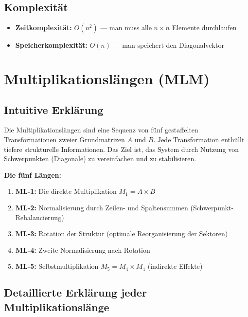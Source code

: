 \documentclass[a4paper,12pt]{article}
\begin{document}
\subsection{Komplexität}

\begin{itemize}
\item \textbf{Zeitkomplexität:} $O(n^2)$ — man muss alle $n \times n$ Elemente durchlaufen
\item \textbf{Speicherkomplexität:} $O(n)$ — man speichert den Diagonalvektor
\end{itemize}


\section{Multiplikationslängen (MLM)}

\subsection{Intuitive Erklärung}

Die Multiplikationslängen sind eine Sequenz von fünf gestaffelten Transformationen zweier Grundmatrizen $A$ und $B$. Jede Transformation enthüllt tiefere strukturelle Informationen. Das Ziel ist, das System durch Nutzung von Schwerpunkten (Diagonale) zu vereinfachen und zu stabilisieren.

\textbf{Die fünf Längen:}
\begin{enumerate}
\item \textbf{ML-1:} Die direkte Multiplikation $M_1 = A \times B$
\item \textbf{ML-2:} Normalisierung durch Zeilen- und Spaltensummen (Schwerpunkt-Rebalancierung)
\item \textbf{ML-3:} Rotation der Struktur (optimale Reorganisierung der Sektoren)
\item \textbf{ML-4:} Zweite Normalisierung nach Rotation
\item \textbf{ML-5:} Selbstmultiplikation $M_5 = M_4 \times M_4$ (indirekte Effekte)
\end{enumerate}

\subsection{Detaillierte Erklärung jeder Multiplikationslänge}
\end{document}
